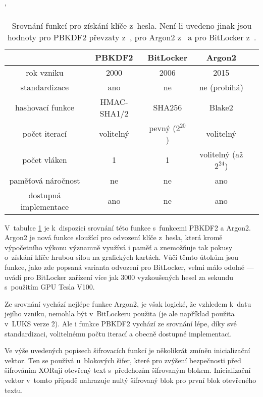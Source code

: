 \begin{table}[h]
\catcode`
\captionsetup{width=0.65\linewidth}
\caption{Srovnání funkcí pro získání klíče z~hesla. Není-li uvedeno jinak jsou hodnoty pro PBKDF2 převzaty z~\cite{Kaliski2000}, pro Argon2 z~\cite{Biryukov2017} a pro BitLocker z~\cite{Metz2011,Agostini2019}.}
\label{tab:kdf-compare}
\begin{center}
\centering
\begin{tabular}{|c|c|c|c|c|}
  \hline
    & \textbf{PBKDF2} & \textbf{BitLocker} & \textbf{Argon2} \\ \hline
rok vzniku & 2000 & 2006 & 2015 \\ \hline
standardizace & ano & ne & ne (probíhá\cite{IETFArgon}) \\ \hline
hashovací funkce & HMAC-SHA1/2 & SHA256 & Blake2 \\ \hline
počet iterací & volitelný & pevný ($2^{20}$) & volitelný \\ \hline
počet vláken & 1 & 1 & volitelný (až $2^{24}$) \\ \hline
paměťová náročnost & ne & ne & ano \\ \hline
dostupná implementace & ano & ne & ano \\ \hline
\end{tabular}
\end{center}
\end{table}

V~tabulce \ref{tab:kdf-compare} je k~dispozici srovnání této funkce s~funkcemi PBKDF2 a Argon2. Argon2 je nová funkce sloužící pro odvození klíče z~hesla, která kromě výpočetního výkonu významně využívá i paměť a znemožňuje tak pokusy o~získání klíče hrubou silou na grafických kartách.\cite{Biryukov2017} Vůči těmto útokům jsou funkce, jako zde popsaná varianta odvození pro BitLocker, velmi málo odolné --- \cite{Agostini2019} uvádí pro BitLocker zařízení více jak 3000 vyzkoušených hesel za sekundu s~použitím GPU Tesla V100.

Ze srovnání vychází nejlépe funkce Argon2, je však logické, že vzhledem k~datu jejího vzniku, nemohla být v~BitLockeru použita (je ale například použita v~LUKS verze 2\cite{Broz20181}). Ale i funkce PBKDF2 vychází ze srovnání lépe, díky své standardizaci, volitelnému počtu iterací a obecně dostupné implementaci.

\label{sec:iv}

Ve výše uvedených popisech šifrovacích funkcí je několikrát zmíněn inicializační vektor. Ten se používá u~blokových šifer, které pro zvýšení bezpečnosti před šifrováním XORují otevřený text s~předchozím šifrovaným blokem. Inicializační vektor v~tomto případě nahrazuje nultý šifrovaný blok pro první blok otevřeného textu.

